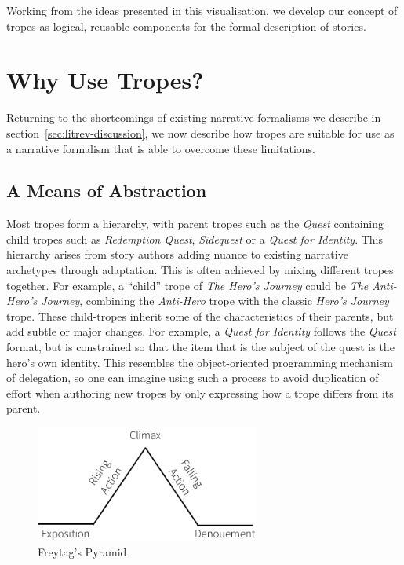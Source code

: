 \documentclass[11pt]{report}
\begin{document}
Working from the ideas presented in this visualisation, we develop our concept of tropes as
logical, reusable components for the formal description of stories. 

\section{Why Use Tropes?}

Returning to the shortcomings of existing narrative formalisms we describe in
section~\ref{sec:litrev-discussion}, we now describe how tropes are suitable for use
as a narrative formalism that is able to overcome these limitations.

\subsection{A Means of Abstraction}
\label{sec:abstraction}
Most tropes form a hierarchy, with parent tropes such as the
\emph{Quest} containing child tropes such as \emph{Redemption Quest},
\emph{Sidequest} or a \emph{Quest for Identity}. This hierarchy arises from
story authors adding nuance to existing narrative archetypes through adaptation.
This is often achieved by mixing different tropes together. For example, a
``child'' trope of \emph{The Hero's Journey} could be \emph{The Anti-Hero's
  Journey}, combining the \emph{Anti-Hero} trope with the classic \emph{Hero's
  Journey} trope.
These child-tropes inherit some
of the characteristics of their parents, but add subtle or major changes. For
example, a \emph{Quest for Identity} follows the \emph{Quest} format, but is
constrained so that the item that is the subject of the quest is the hero's own
identity. This resembles the object-oriented programming mechanism of delegation, so one can imagine using
such a process to avoid duplication of effort when authoring new tropes by only
expressing how a trope differs from its parent.

\begin{figure}[!t]
\centerline{\includegraphics[height=1.5in]{freytag.png}}
\caption{Freytag's Pyramid} \label{fig:freytag}
\end{figure}
\end{document}

